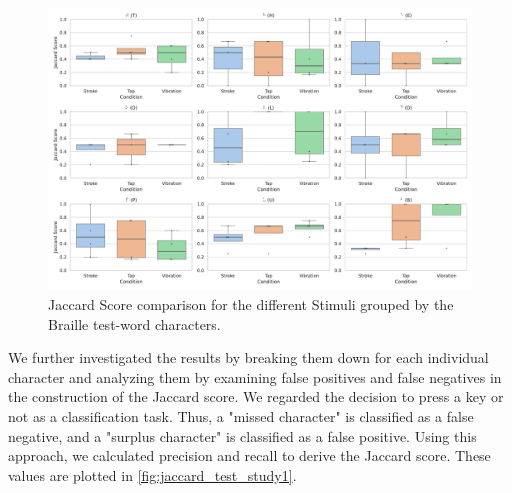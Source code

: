 \begin{table}[ht]
\caption{Results of the Kruskal-Wallis significance tests for the wordtests \enquote{THE}, \enquote{OLD}, and \enquote{PUB} with a $\eta^2$ Effect Size.}
\label{table:significance_results_test_firstStudy}
\end{table}



\begin{figure}
    \centering
    \includegraphics[width=\linewidth]{src/pictures/Study1Data_Experiment/character_jaccard_test_study1.pdf}
    \caption{Jaccard Score comparison for the different Stimuli grouped by the Braille test-word characters.}
    \label{fig:jaccard_test_study1}
\end{figure}


We further investigated the results by breaking them down for each individual character and analyzing them by examining false positives and false negatives in the construction of the Jaccard score. 
We regarded the decision to press a key or not as a classification task. 
Thus, a "missed character" is classified as a false negative, and a "surplus character" is classified as a false positive. 
Using this approach, we calculated precision and recall to derive the Jaccard score. 
These values are plotted in \autoref{fig:jaccard_test_study1}. 

